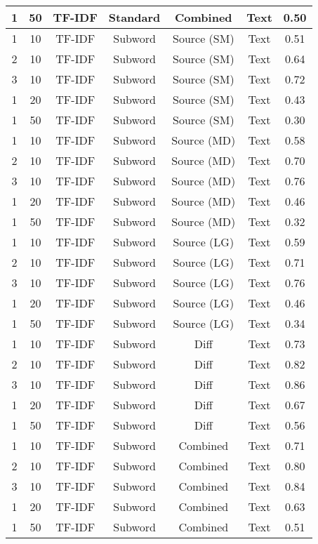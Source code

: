 \begin{longtable}{|c|c|c|c|c|c|c|}
\hline
1 & 50 & TF-IDF & Standard & Combined & Text & 0.50 \\
\hline
1 & 10 & TF-IDF & Subword & Source (SM) & Text & 0.51 \\
\hline
2 & 10 & TF-IDF & Subword & Source (SM) & Text & 0.64 \\
\hline
3 & 10 & TF-IDF & Subword & Source (SM) & Text & 0.72 \\
\hline
1 & 20 & TF-IDF & Subword & Source (SM) & Text & 0.43 \\
\hline
1 & 50 & TF-IDF & Subword & Source (SM) & Text & 0.30 \\
\hline
1 & 10 & TF-IDF & Subword & Source (MD) & Text & 0.58 \\
\hline
2 & 10 & TF-IDF & Subword & Source (MD) & Text & 0.70 \\
\hline
3 & 10 & TF-IDF & Subword & Source (MD) & Text & 0.76 \\
\hline
1 & 20 & TF-IDF & Subword & Source (MD) & Text & 0.46 \\
\hline
1 & 50 & TF-IDF & Subword & Source (MD) & Text & 0.32 \\
\hline
1 & 10 & TF-IDF & Subword & Source (LG) & Text & 0.59 \\
\hline
2 & 10 & TF-IDF & Subword & Source (LG) & Text & 0.71 \\
\hline
3 & 10 & TF-IDF & Subword & Source (LG) & Text & 0.76 \\
\hline
1 & 20 & TF-IDF & Subword & Source (LG) & Text & 0.46 \\
\hline
1 & 50 & TF-IDF & Subword & Source (LG) & Text & 0.34 \\
\hline
1 & 10 & TF-IDF & Subword & Diff & Text & 0.73 \\
\hline
2 & 10 & TF-IDF & Subword & Diff & Text & 0.82 \\
\hline
3 & 10 & TF-IDF & Subword & Diff & Text & 0.86 \\
\hline
1 & 20 & TF-IDF & Subword & Diff & Text & 0.67 \\
\hline
1 & 50 & TF-IDF & Subword & Diff & Text & 0.56 \\
\hline
1 & 10 & TF-IDF & Subword & Combined & Text & 0.71 \\
\hline
2 & 10 & TF-IDF & Subword & Combined & Text & 0.80 \\
\hline
3 & 10 & TF-IDF & Subword & Combined & Text & 0.84 \\
\hline
1 & 20 & TF-IDF & Subword & Combined & Text & 0.63 \\
\hline
1 & 50 & TF-IDF & Subword & Combined & Text & 0.51 \\

\end{longtable}
